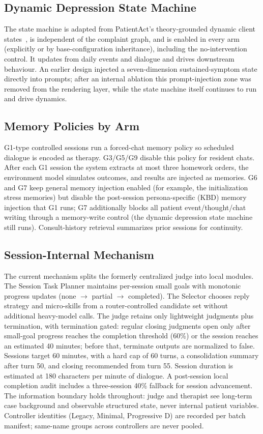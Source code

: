 \documentclass[10pt]{article}
\begin{document}
\subsection{Dynamic Depression State Machine}

The state machine is adapted from PatientAct's theory-grounded dynamic client states~\citep{patientact2026}, is independent of the complaint graph, and is enabled in every arm (explicitly or by base-configuration inheritance), including the no-intervention control.
It updates from daily events and dialogue and drives downstream behaviour.
An earlier design injected a seven-dimension sustained-symptom state directly into prompts; after an internal ablation this prompt-injection zone was removed from the rendering layer, while the state machine itself continues to run and drive dynamics.

\subsection{Memory Policies by Arm}

G1-type controlled sessions run a forced-chat memory policy so scheduled dialogue is encoded as therapy.
G3/G5/G9 disable this policy for resident chats.
After each G1 session the system extracts at most three homework orders, the environment model simulates outcomes, and results are injected as memories.
G6 and G7 keep general memory injection enabled (for example, the initialization stress memories) but disable the post-session persona-specific (KBD) memory injection that G1 runs; G7 additionally blocks all patient event/thought/chat writing through a memory-write control (the dynamic depression state machine still runs).
Consult-history retrieval summarizes prior sessions for continuity.

\subsection{Session-Internal Mechanism}

The current mechanism splits the formerly centralized judge into local modules.
The Session Task Planner maintains per-session small goals with monotonic progress updates (none $\rightarrow$ partial $\rightarrow$ completed).
The Selector chooses reply strategy and micro-skills from a router-controlled candidate set without additional heavy-model calls.
The judge retains only lightweight judgments plus termination, with termination gated: regular closing judgments open only after small-goal progress reaches the completion threshold (60\%) or the session reaches an estimated 40 minutes; before that, terminate outputs are normalized to false.
Sessions target 60 minutes, with a hard cap of 60 turns, a consolidation summary after turn 50, and closing recommended from turn 55.
Session duration is estimated at 180 characters per minute of dialogue.
A post-session local completion audit includes a three-session 40\% fallback for session advancement.
The information boundary holds throughout: judge and therapist see long-term case background and observable structured state, never internal patient variables.
Controller identities (Legacy, Minimal, Progressive D) are recorded per batch manifest; same-name groups across controllers are never pooled.
\end{document}
